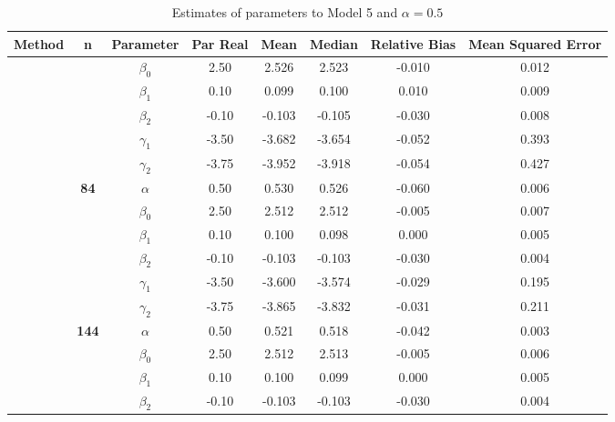 \begin{table}[h]

\caption{\label{tab:Est_model_5_Alpha0.5}Estimates of parameters to Model 5 and $\alpha=0.5$}
\centering
\begin{tabular}[t]{>{}c>{}ccccccc}
\toprule
Method & n & Parameter & Par Real & Mean & Median & Relative Bias & Mean Squared Error\\
\midrule
 &  & $\beta_0$ & 2.50 & 2.526 & 2.523 & -0.010 & 0.012\\

 &  & $\beta_1$ & 0.10 & 0.099 & 0.100 & 0.010 & 0.009\\

 &  & $\beta_2$ & -0.10 & -0.103 & -0.105 & -0.030 & 0.008\\

 &  & $\gamma_1$ & -3.50 & -3.682 & -3.654 & -0.052 & 0.393\\

 &  & $\gamma_2$ & -3.75 & -3.952 & -3.918 & -0.054 & 0.427\\

 & \multirow{-6}{*}{\centering\arraybackslash \textbf{84}} & $\alpha$ & 0.50 & 0.530 & 0.526 & -0.060 & 0.006\\

 &  & $\beta_0$ & 2.50 & 2.512 & 2.512 & -0.005 & 0.007\\

 &  & $\beta_1$ & 0.10 & 0.100 & 0.098 & 0.000 & 0.005\\

 &  & $\beta_2$ & -0.10 & -0.103 & -0.103 & -0.030 & 0.004\\

 &  & $\gamma_1$ & -3.50 & -3.600 & -3.574 & -0.029 & 0.195\\

 &  & $\gamma_2$ & -3.75 & -3.865 & -3.832 & -0.031 & 0.211\\

 & \multirow{-6}{*}{\centering\arraybackslash \textbf{144}} & $\alpha$ & 0.50 & 0.521 & 0.518 & -0.042 & 0.003\\

 &  & $\beta_0$ & 2.50 & 2.512 & 2.513 & -0.005 & 0.006\\

 &  & $\beta_1$ & 0.10 & 0.100 & 0.099 & 0.000 & 0.005\\

 &  & $\beta_2$ & -0.10 & -0.103 & -0.103 & -0.030 & 0.004\\


\end{tabular}
\end{table}
